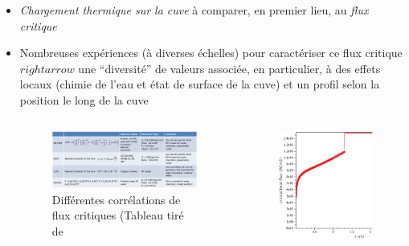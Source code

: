 \begin{frame}[fragile]
\begin{itemize}
\item \emph{Chargement thermique sur la cuve} à comparer, en premier lieu, au \emph{flux critique}
\item Nombreuses expériences (à diverses échelles) pour caractériser ce flux critique $rightarrow$ une ``diversité'' de valeurs associée, en particulier, à des effets locaux (chimie de l'eau et état de surface de la cuve) et un profil selon la position le long de la cuve
\begin{columns}
\begin{column}{0.75\textwidth}
\begin{figure}[H]
\centering \includegraphics[width=1.0\textwidth]{Figures/Tab_Atkhen2020.png}
\caption{\tiny Différentes corrélations de flux critiques (Tableau tiré de \cite{Atkhen2020}}
\end{figure}
\end{column}
\begin{column}{0.25\textwidth}
\begin{figure}[H]
\centering \includegraphics[width=1.0\textwidth]{Figures/ulpu.eps}

\end{figure}
\end{column}
\end{columns}
\end{itemize}
\end{frame}
